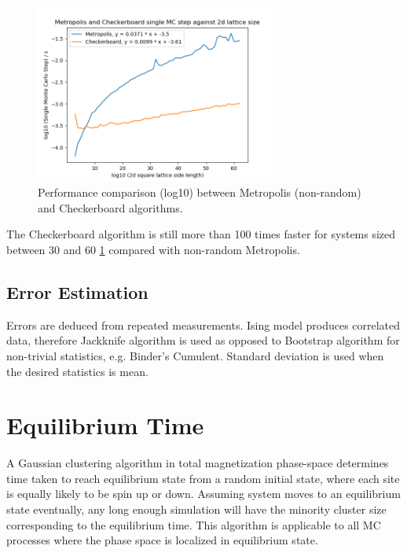 \documentclass[%
showkeys,
bibnotes,
amsmath,amssymb,
floatfix,
]{revtex4-1}
\begin{document}
\begin{figure}[H] \centering
	\includegraphics[width=0.7\textwidth]{../figures/metropolis_performance_no_rand}
	\caption{\label{fig:metropolis_performance_no_rand} Performance comparison (log10) between Metropolis (non-random) and Checkerboard algorithms.}
\end{figure}

The Checkerboard algorithm is still more than 100 times faster for systems sized between 30 and 60 \ref{fig:metropolis_performance_no_rand} compared with non-random Metropolis.

\subsection{\label{sec:method:error}Error Estimation}

Errors are deduced from repeated measurements. Ising model produces correlated data, therefore Jackknife algorithm is used as opposed to Bootstrap algorithm for non-trivial statistics, e.g. Binder's Cumulent. Standard deviation is used when the desired statistics is mean.

\section{\label{sec:equi_time}Equilibrium Time}
A Gaussian clustering algorithm in total magnetization phase-space determines time taken to reach equilibrium state from a random initial state, where each site is equally likely to be spin up or down. Assuming system moves to an equilibrium state eventually, any long enough simulation will have the minority cluster size corresponding to the equilibrium time. This algorithm is applicable to all MC processes where the phase space is localized in equilibrium state.
\end{document}
